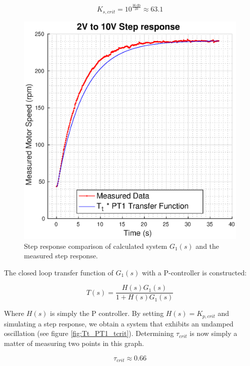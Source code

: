 \begin{equation}
    K_{s,crit} = 10^{\frac{\SI{36}{\decibel}}{20}} \approx 63.1
\end{equation}

\begin{figure}[h]
    \centering
    \includegraphics[width=\imagewidth]{images/Tt_PT1}
    \caption{Step response comparison of calculated system $G_1(s)$ and the measured step response.}
    \label{fig:Tt_PT1_step}
\end{figure}

The  closed  loop  transfer  function  of  $G_1(s)$  with  a  P-controller  is
constructed:

\begin{equation}
    T(s) = \frac{H(s)G_1(s)}{1 + H(s)G_1(s)}
\end{equation}

Where  $H(s)$  is  simply  the  P controller. By setting $H(s)=K_{p,crit}$ and
simulating a step  response,  we  obtain  a  system  that exhibits an undamped
oscillation (see  figure \ref{fig:Tt_PT1_tcrit}). Determining $\tau_{crit}$ is
now simply a matter of measuring two points in this graph.

\begin{equation}
    \tau_{crit} \approx 0.66
\end{equation}

